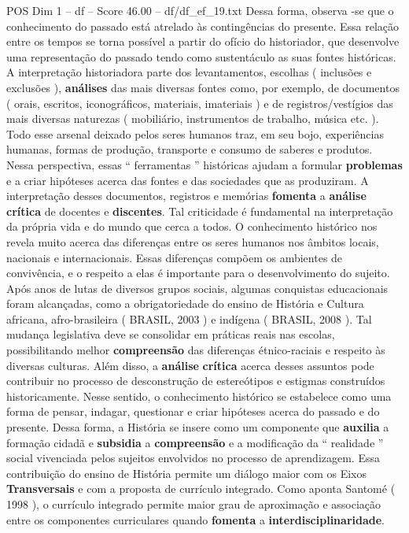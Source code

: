 \begin{textsample}{POS Dim 1 – df – Score 46.00 – df/df\_ef\_19.txt}
Dessa forma, observa -se que o conhecimento do passado está atrelado às contingências do presente.
Essa relação entre os tempos se torna possível a partir do ofício do historiador, que desenvolve uma representação do passado tendo como sustentáculo as suas fontes históricas.
A interpretação historiadora parte dos levantamentos, escolhas ( inclusões e exclusões ), \textbf{análises} das mais diversas fontes como, por exemplo, de documentos ( orais, escritos, iconográficos, materiais, imateriais ) e de registros/vestígios das mais diversas naturezas ( mobiliário, instrumentos de trabalho, música etc. ).
Todo esse arsenal deixado pelos seres humanos traz, em seu bojo, experiências humanas, formas de produção, transporte e consumo de saberes e produtos.
Nessa perspectiva, essas “ ferramentas ” históricas ajudam a formular \textbf{problemas} e a criar hipóteses acerca das fontes e das sociedades que as produziram.
A interpretação desses documentos, registros e memórias \textbf{fomenta} a \textbf{análise} \textbf{crítica} de docentes e \textbf{discentes}.
Tal criticidade é fundamental na interpretação da própria vida e do mundo que cerca a todos.
O conhecimento histórico nos revela muito acerca das diferenças entre os seres humanos nos âmbitos locais, nacionais e internacionais.
Essas diferenças compõem os ambientes de convivência, e o respeito a elas é importante para o desenvolvimento do sujeito.
Após anos de lutas de diversos grupos sociais, algumas conquistas educacionais foram alcançadas, como a obrigatoriedade do ensino de História e Cultura africana, afro-brasileira ( BRASIL, 2003 ) e indígena ( BRASIL, 2008 ).
Tal mudança legislativa deve se consolidar em práticas reais nas escolas, possibilitando melhor \textbf{compreensão} das diferenças étnico-raciais e respeito às diversas culturas.
Além disso, a \textbf{análise} \textbf{crítica} acerca desses assuntos pode contribuir no processo de desconstrução de estereótipos e estigmas construídos historicamente.
Nesse sentido, o conhecimento histórico se estabelece como uma forma de pensar, indagar, questionar e criar hipóteses acerca do passado e do presente.
Dessa forma, a História se insere como um componente que \textbf{auxilia} a formação cidadã e \textbf{subsidia} a \textbf{compreensão} e a modificação da “ realidade ” social vivenciada pelos sujeitos envolvidos no processo de aprendizagem.
Essa contribuição do ensino de História permite um diálogo maior com os Eixos \textbf{Transversais} e com a proposta de currículo integrado.
Como aponta Santomé ( 1998 ), o currículo integrado permite maior grau de aproximação e associação entre os componentes curriculares quando \textbf{fomenta} a \textbf{interdisciplinaridade}.

\end{textsample}
